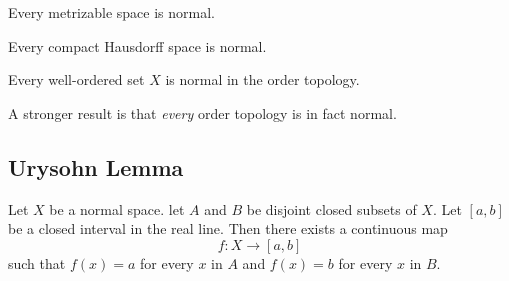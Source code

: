 \begin{theorem}
Every metrizable space is normal.
\end{theorem}

\begin{theorem}
Every compact Hausdorff space is normal.
\end{theorem}

\begin{theorem}
Every well-ordered set $X$ is normal in the order topology.
\end{theorem}

\begin{remark}
A stronger result is that \textit{every} order topology is in fact normal.
\end{remark}


\subsection{Urysohn Lemma}

\begin{theorem}
Let $X$ be a normal space. let $A$ and $B$ be disjoint closed subsets of $X$. Let $[a, b]$ be a closed interval in the real line.
Then there exists a continuous map
\[
    f\colon X \rightarrow [a, b]
\]
such that $f(x) = a$ for every $x$ in $A$ and $f(x) = b$ for every $x$ in $B$.
\end{theorem}
